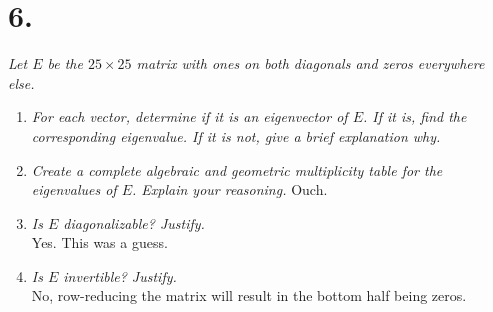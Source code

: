 \documentclass[12pt]{article}
\begin{document}
\section*{6.}
\textit{Let $E$ be the $25 \times 25$ matrix with ones on both diagonals and
zeros everywhere else.}
\begin{enumerate}[label=(\alph*)]
	\item \textit{For each vector, determine if it is an eigenvector of $E$.
	If it is, find the corresponding eigenvalue. If it is not, give a brief
	explanation why.}
	{
	}
	
	\item \textit{Create a complete algebraic and geometric multiplicity table
	for the eigenvalues of $E$. Explain your reasoning.}
	Ouch.
	
	\item \textit{Is $E$ diagonalizable? Justify.} \\[\baselineskip]
	Yes. This was a guess.
	
	\item \textit{Is $E$ invertible? Justify.} \\[\baselineskip]
	No, row-reducing the matrix will result in the bottom half being zeros.
\end{enumerate}
\end{document}
